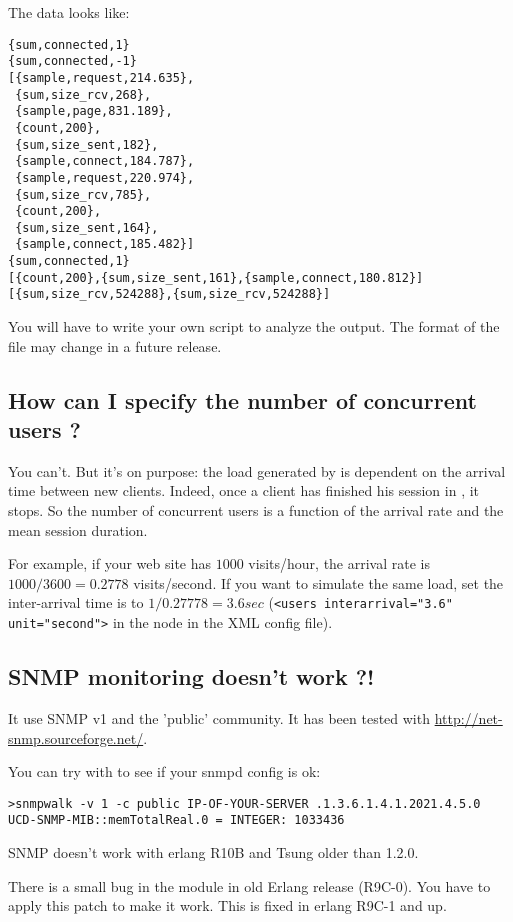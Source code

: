 \documentclass{TSUNG-en}
\begin{document}
\begin{appendix}
The data looks like:
\begin{Verbatim}
{sum,connected,1}
{sum,connected,-1}
[{sample,request,214.635},
 {sum,size_rcv,268},
 {sample,page,831.189},
 {count,200},
 {sum,size_sent,182},
 {sample,connect,184.787},
 {sample,request,220.974},
 {sum,size_rcv,785},
 {count,200},
 {sum,size_sent,164},
 {sample,connect,185.482}]
{sum,connected,1}
[{count,200},{sum,size_sent,161},{sample,connect,180.812}]
[{sum,size_rcv,524288},{sum,size_rcv,524288}]
\end{Verbatim}

You will have to write your own script to analyze the output.
The format of the file may change in a future release.


\subsection{How can I specify the number of concurrent users ?}

You can't. But it's on purpose: the load generated by
 is dependent on the arrival time between new
clients. Indeed, once a client has finished his session in
, it stops. So the number of concurrent users is
a function of the arrival rate and the mean session duration.

For example, if your web site has $1000$ visits/hour, the arrival rate
is $1000/3600 = 0.2778$ visits/second. If you want to simulate the same
load, set the inter-arrival time is to $1/0.27778 = 3.6 sec$ (\texttt{<users
interarrival="3.6" unit="second">} in the  node in the
XML config file).

\subsection{SNMP monitoring doesn't work ?!}
\label{sec:faq:snmp}
It use SNMP v1 and the 'public' community. It has been tested with
\url{http://net-snmp.sourceforge.net/}.

You can try with  to see if your snmpd config is ok:

\begin{Verbatim}
>snmpwalk -v 1 -c public IP-OF-YOUR-SERVER .1.3.6.1.4.1.2021.4.5.0
UCD-SNMP-MIB::memTotalReal.0 = INTEGER: 1033436
\end{Verbatim}

SNMP doesn't work with erlang R10B and Tsung older than 1.2.0.

There is a small bug in the  module in old Erlang
release (R9C-0). You have to apply this patch to make it
work. This is fixed in erlang R9C-1 and up.



\end{appendix}
\end{document}
